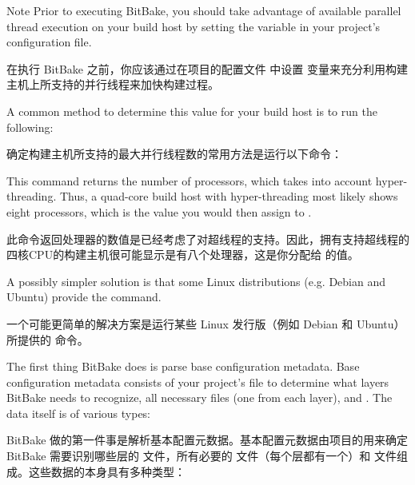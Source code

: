 \begin{noteblock}{Note}%
Prior to executing BitBake, you should take advantage of available parallel thread execution on your build host by setting the  variable in your project's  configuration file.

\medskip
在执行 BitBake 之前，你应该通过在项目的配置文件  中设置  变量来充分利用构建主机上所支持的并行线程来加快构建过程。

\medskip
A common method to determine this value for your build host is to run the following:

\medskip
确定构建主机所支持的最大并行线程数的常用方法是运行以下命令：

\medskip
{}

\medskip
This command returns the number of processors, which takes into account hyper-threading. Thus, a quad-core build host with hyper-threading most likely shows eight processors, which is the value you would then assign to .

\medskip
此命令返回处理器的数值是已经考虑了对超线程的支持。因此，拥有支持超线程的四核CPU的构建主机很可能显示是有八个处理器，这是你分配给  的值。

\medskip
A possibly simpler solution is that some Linux distributions (e.g. Debian and Ubuntu) provide the  command.

\medskip
一个可能更简单的解决方案是运行某些 Linux 发行版（例如 Debian 和 Ubuntu）所提供的  命令。

\end{noteblock}


The first thing BitBake does is parse base configuration metadata. Base configuration metadata consists of your project's  file to determine what layers BitBake needs to recognize, all necessary  files (one from each layer), and . The data itself is of various types:

BitBake 做的第一件事是解析基本配置元数据。基本配置元数据由项目的用来确定 BitBake 需要识别哪些层的  文件，所有必要的  文件（每个层都有一个）和  文件组成。这些数据的本身具有多种类型：


